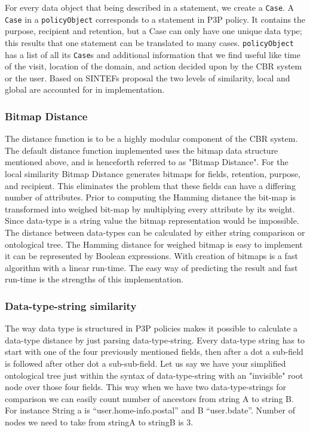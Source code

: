 For every data object that being described in a statement, we create a \texttt{Case}. A \texttt{Case} in a \texttt{policyObject} corresponds to a statement in P3P policy. It contains the purpose, recipient and retention, but a Case can only have one unique data type; this results that one statement can be translated to many cases. \texttt{policyObject} has a list of all its \texttt{Case}s and additional information that we find useful like time of the visit, location of the domain, and action decided upon by the CBR system or the user. Based on SINTEFs proposal the two levels of similarity, local and global are accounted for in implementation. 

\subsubsection{Bitmap Distance}

The distance function is to be a highly modular component of the CBR system. The default distance function implemented uses the bitmap data structure mentioned above, and is henceforth referred to as "Bitmap Distance". For the local similarity Bitmap Distance generates bitmaps for fields, retention, purpose, and recipient. This eliminates the problem that these fields can have a differing number of attributes.  Prior to computing the Hamming distance the bit-map is transformed into weighed bit-map by multiplying every attribute by its weight. Since data-type is a string value the bitmap representation would be impossible. The distance between data-types can be calculated by either string comparison or ontological tree. The Hamming distance for weighed bitmap is easy to implement it can be represented by Boolean expressions. With creation of bitmaps is a fast algorithm with a linear run-time. The easy way of predicting the result and fast run-time is the strengths of this implementation.



\subsubsection{Data-type-string similarity}
The way data type is structured in P3P policies makes it possible to calculate a data-type distance by just parsing data-type-string. Every data-type string has to start with one of the four previously mentioned fields, then after a dot a sub-field is followed after other dot a sub-sub-field. Let us say we have your simplified ontological tree just within the syntax of data-type-string with an "invisible" root node over those four fields. This way when we have two data-type-strings for comparison we can easily count number of ancestors from string A to string B. For instance String a is “user.home-info.postal” and B “user.bdate”. Number of nodes we need to take from stringA to stringB is 3. 

